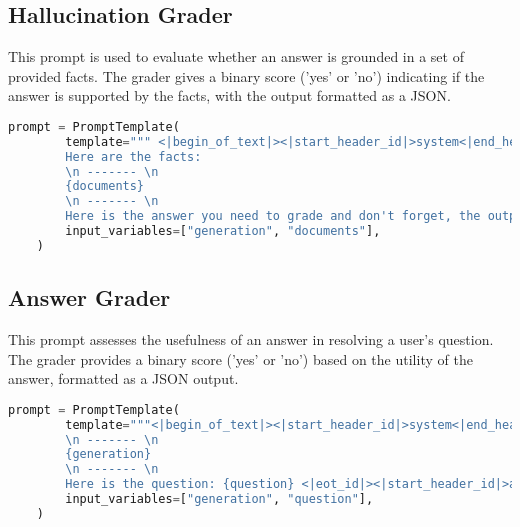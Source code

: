 \subsection{Hallucination Grader}

This prompt is used to evaluate whether an answer is grounded in a set of provided facts. The grader gives a binary score ('yes' or 'no') indicating if the answer is supported by the facts, with the output formatted as a JSON.

\begin{lstlisting}[language=Python, caption=\it{Prompt used for the hallucination grader.}]
    prompt = PromptTemplate(
        template=""" <|begin_of_text|><|start_header_id|>system<|end_header_id|> You are a grader assessing whether an answer is grounded in / supported by a set of facts. Give a binary 'yes' or 'no' score to indicate whether the answer is grounded in / supported by a set of facts. Provide the binary score as a JSON with a  single key 'score' and no preamble or explanation. Make sure to exactly output a json with one key 'score' <|eot_id|><|start_header_id|>user<|end_header_id|>
        Here are the facts:
        \n ------- \n
        {documents} 
        \n ------- \n
        Here is the answer you need to grade and don't forget, the output needs to be in json format with one and only one key called score (yes if the answer is grouned to the facts else no): {generation}  <|eot_id|><|start_header_id|>assistant<|end_header_id|>""",
        input_variables=["generation", "documents"],
    )
\end{lstlisting}

\subsection{Answer Grader}

This prompt assesses the usefulness of an answer in resolving a user's question. The grader provides a binary score ('yes' or 'no') based on the utility of the answer, formatted as a JSON output.

\begin{lstlisting}[language=Python, caption=\it{Prompt used for the hallucination grader.}]
    prompt = PromptTemplate(
        template="""<|begin_of_text|><|start_header_id|>system<|end_header_id|> You are a grader assessing whether an answer is useful to resolve a question. Give a binary score 'yes' or 'no' to indicate whether the answer is useful to resolve a question. Provide the binary score as a JSON with a single key 'score' and no preamble or explanation. <|eot_id|><|start_header_id|>user<|end_header_id|> Here is the answer:
        \n ------- \n
        {generation} 
        \n ------- \n
        Here is the question: {question} <|eot_id|><|start_header_id|>assistant<|end_header_id|>""",
        input_variables=["generation", "question"],
    )
\end{lstlisting}

